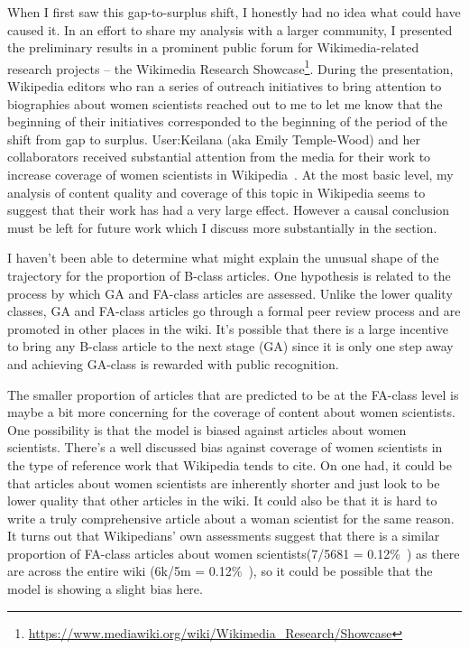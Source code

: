 When I first saw this gap-to-surplus shift, I honestly had no idea what could have caused it.  In an effort to share my analysis with a larger community, I presented the preliminary results in a prominent public forum for Wikimedia-related research projects -- the Wikimedia Research Showcase\footnote{\url{https://www.mediawiki.org/wiki/Wikimedia_Research/Showcase}}.  During the presentation, Wikipedia editors who ran a series of outreach initiatives to bring attention to biographies about women scientists reached out to me to let me know that the beginning of their initiatives corresponded to the beginning of the period of the shift from gap to surplus.  User:Keilana (aka Emily Temple-Wood) and her collaborators received substantial attention from the media for their work to increase coverage of women scientists in Wikipedia~\cite{change13emily}.  At the most basic level, my analysis of content quality and coverage of this topic in Wikipedia seems to suggest that their work has had a very large effect.  However a causal conclusion must be left for future work which I discuss more substantially in the  section.

I haven't been able to determine what might explain the unusual shape of the trajectory for the proportion of B-class articles.  One hypothesis is related to the process by which GA and FA-class articles are assessed.  Unlike the lower quality classes, GA and FA-class articles go through a formal peer review process and are promoted in other places in the wiki.  It's possible that there is a large incentive to bring any B-class article to the next stage (GA) since it is only one step away and achieving GA-class is rewarded with public recognition.

The smaller proportion of articles that are predicted to be at the FA-class level is maybe a bit more concerning for the coverage of content about women scientists.  One possibility is that the model is biased against articles about women scientists.  There's a well discussed bias against coverage of women scientists in the type of reference work that Wikipedia tends to cite.  On one had, it could be that articles about women scientists are inherently shorter and just look to be lower quality that other articles in the wiki.  It could also be that it is hard to write a truly comprehensive article about a woman scientist for the same reason.  It turns out that Wikipedians' own assessments suggest that there is a similar proportion of FA-class articles about women scientists(7/5681 = 0.12\%~\cite{womenscientist_stats}) as there are across the entire wiki (6k/5m = 0.12\%~\cite{wikipedia1.0stats}), so it could be possible that the model is showing a slight bias here.
